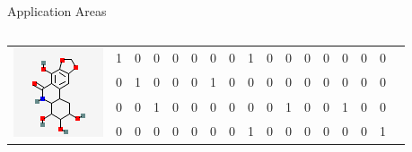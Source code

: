\documentclass[first=dgreen,second=purple,logo=yellowexc]{aaltoslides}
\begin{document}
\begin{frame}[allowframebreaks]{Application Areas }
\begin{itemize}
\begin{center}
{{\begin{table}
\begin{tabular}{p{1cm}p{0.08cm}p{0.08cm}p{0.08cm}p{0.08cm}p{0.08cm}p{0.08cm}p{0.08cm}p{0.08cm}p{0.08cm}p{0.08cm}p{0.08cm}p{0.08cm}p{0.08cm}p{0.08cm}p{0.08cm}p{0.08cm}}
            \end{tabular}
            \end{table}}
            {\begin{table}
            \scriptsize
            \begin{tabular}{p{1cm}p{0.08cm}p{0.08cm}p{0.08cm}p{0.08cm}p{0.08cm}p{0.08cm}p{0.08cm}p{0.08cm}p{0.08cm}p{0.08cm}p{0.08cm}p{0.08cm}p{0.08cm}p{0.08cm}p{0.08cm}p{0.08cm}}
            \multirow{4}{*}{\includegraphics[scale = 0.3]{./plots/mol2.png}} & 
            \cellcolor{purple}1&\cellcolor{blue}0&\cellcolor{blue}0&\cellcolor{blue}0&\cellcolor{blue}0&\cellcolor{blue}0&\cellcolor{blue}0&\cellcolor{purple}1&\cellcolor{blue}0&\cellcolor{blue}0&\cellcolor{blue}0&\cellcolor{blue}0&\cellcolor{blue}0&\cellcolor{blue}0&\cellcolor{blue}0 \\ 
            &\cellcolor{blue}0&\cellcolor{purple}1&\cellcolor{blue}0&\cellcolor{blue}0&\cellcolor{blue}0&\cellcolor{purple}1&\cellcolor{blue}0&\cellcolor{blue}0&\cellcolor{blue}0&\cellcolor{blue}0&\cellcolor{blue}0&\cellcolor{blue}0&\cellcolor{blue}0&\cellcolor{blue}0&\cellcolor{blue}0 \\ 
            &\cellcolor{blue}0&\cellcolor{blue}0&\cellcolor{purple}1&\cellcolor{blue}0&\cellcolor{blue}0&\cellcolor{blue}0&\cellcolor{blue}0&\cellcolor{blue}0&\cellcolor{blue}0&\cellcolor{purple}1&\cellcolor{blue}0&\cellcolor{blue}0&\cellcolor{purple}1&\cellcolor{blue}0&\cellcolor{blue}0 \\ 
            &\cellcolor{blue}0&\cellcolor{blue}0&\cellcolor{blue}0&\cellcolor{blue}0&\cellcolor{blue}0&\cellcolor{blue}0&\cellcolor{blue}0&\cellcolor{purple}1&\cellcolor{blue}0&\cellcolor{blue}0&\cellcolor{blue}0&\cellcolor{blue}0&\cellcolor{blue}0&\cellcolor{blue}0&\cellcolor{purple}1 \\ 
            \end{tabular}
            \end{table}}
}
\end{center}
\end{itemize}
\end{frame}
\end{document}

